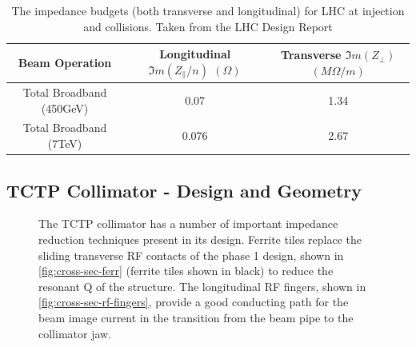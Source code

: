 \begin{table}
\caption{The impedance budgets (both transverse and longitudinal) for LHC at injection and collisions. Taken from the LHC Design Report \cite{Ruggiero:LHCColEff}}
\begin{center}
\begin{tabular}{c | c | c}
Beam Operation & Longitudinal $\Im{}m ( Z_{\parallel}/n )$ $( \Omega )$ & Transverse $\Im{}m ( Z_{\perp} )$ $(M \Omega /m )$\\ \hline
Total Broadband (450GeV) & 0.07 & 1.34 \\ \hline
Total Broadband (7TeV) & 0.076 & 2.67 \\ \hline
\end{tabular}
\end{center}
\label{tab:lhc-impedance-budget}
\end{table}

\subsection{TCTP Collimator - Design and Geometry}

\begin{figure}
\caption{The TCTP collimator has a number of important impedance reduction techniques present in its design. Ferrite tiles replace the sliding transverse RF contacts of the phase 1 design, shown in \ref{fig:cross-sec-ferr} (ferrite tiles shown in black) to reduce the resonant Q of the structure. The longitudinal RF fingers, shown in \ref{fig:cross-sec-rf-fingers}, provide a good conducting path for the beam image current in the transition from the beam pipe to the collimator jaw.}
\label{fig:tctp-figure}
\end{figure}

